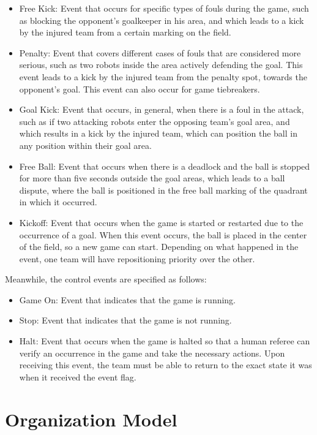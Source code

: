 \begin{itemize}
    \item Free Kick: Event that occurs for specific types of fouls during the game, such as blocking the opponent's goalkeeper in his area, and which leads to a kick by the injured team from a certain marking on the field.
    \item Penalty: Event that covers different cases of fouls that are considered more serious, such as two robots inside the area actively defending the goal. This event leads to a kick by the injured team from the penalty spot, towards the opponent's goal. This event can also occur for game tiebreakers.
    \item Goal Kick: Event that occurs, in general, when there is a foul in the attack, such as if two attacking robots enter the opposing team's goal area, and which results in a kick by the injured team, which can position the ball in any position within their goal area.
    \item Free Ball: Event that occurs when there is a deadlock and the ball is stopped for more than five seconds outside the goal areas, which leads to a ball dispute, where the ball is positioned in the free ball marking of the quadrant in which it occurred.
    \item Kickoff: Event that occurs when the game is started or restarted due to the occurrence of a goal. When this event occurs, the ball is placed in the center of the field, so a new game can start. Depending on what happened in the event, one team will have repositioning priority over the other.
 \end{itemize}

Meanwhile, the control events are specified as follows:

\begin{itemize}
     \item Game On: Event that indicates that the game is running.
     \item Stop: Event that indicates that the game is not running.
     \item Halt: Event that occurs when the game is halted so that a human referee can verify an occurrence in the game and take the necessary actions. Upon receiving this event, the team must be able to return to the exact state it was when it received the event flag.
  \end{itemize}

\section{Organization Model}
\label{sec:organization_model}

